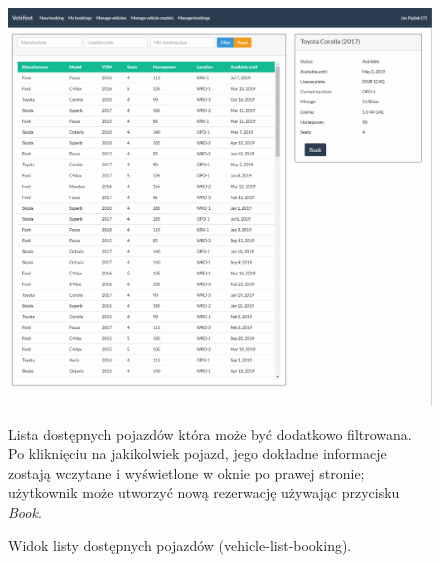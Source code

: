 \documentclass[eng,printmode,openany]{mgr}
\begin{document}
	\begin{figure}[H]
		\centering
		\includegraphics[width=\textwidth]{images/views/vehicle-booking-2.png}
		\caption{Widok listy dostępnych pojazdów (vehicle-list-booking).}
		\small 
		Lista dostępnych pojazdów która może być dodatkowo filtrowana. Po kliknięciu na jakikolwiek pojazd, jego dokładne informacje zostają wczytane i wyświetlone w oknie po prawej stronie; użytkownik może utworzyć nową rezerwację używając przycisku \textit{Book}.
	\end{figure}
	
\end{document}

